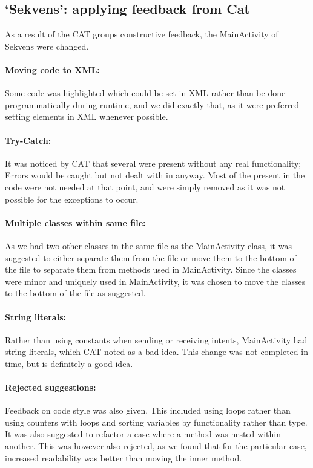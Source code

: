 \subsection{`Sekvens': applying feedback from Cat}\label{subsec:collab_sekvensresult}
As a result of the CAT groups constructive feedback, the MainActivity of Sekvens were changed.

\paragraph{Moving code to XML:}
Some code was highlighted which could be set in XML rather than be done programmatically during runtime, and we did exactly that, as it were preferred setting elements in XML whenever possible.

\paragraph{Try-Catch:}
It was noticed by CAT that several  were present without any real functionality; Errors would be caught but not dealt with in anyway. Most of the  present in the code were not needed at that point, and were simply removed as it was not possible for the exceptions to occur.

\paragraph{Multiple classes within same file:}
As we had two other classes in the same file as the MainActivity class, it was suggested to either separate them from the file or move them to the bottom of the file to separate them from methods used in MainActivity. Since the classes were minor and uniquely used in MainActivity, it was chosen to move the classes to the bottom of the file as suggested.

\paragraph{String literals:}
Rather than using constants when sending or receiving intents, MainActivity had string literals, which CAT noted as a bad idea. This change was not completed in time, but is definitely a good idea.

\paragraph{Rejected suggestions:}
Feedback on code style was also given. This included using  loops rather than using counters with  loops and sorting variables by functionality rather than type. It was also suggested to refactor a case where a method was nested within another. This was however also rejected, as we found that for the particular case, increased readability was better than moving the inner method.